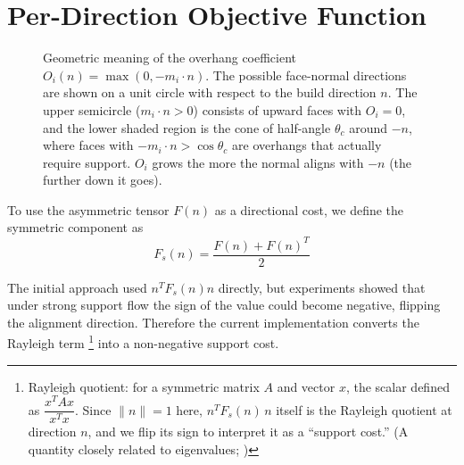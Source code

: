 \documentclass[11pt,a4paper]{article}
\begin{document}
\section{Per-Direction Objective Function}

\begin{figure}[H]
\centering
{}
\caption{Geometric meaning of the overhang coefficient $O_i(n)=\max(0,-m_i\cdot n)$. The possible face-normal directions
are shown on a unit circle with respect to the build direction $n$. The upper semicircle ($m_i\cdot n>0$) consists of upward faces with $O_i=0$,
and the lower shaded region is the cone of half-angle $\theta_c$ around $-n$, where faces with $-m_i\cdot n>\cos\theta_c$ are overhangs that actually
require support. $O_i$ grows the more the normal aligns with $-n$ (the further down it goes).}
\label{fig:overhang-coeff}
\end{figure}

To use the asymmetric tensor $F(n)$ as a directional cost, we define the symmetric component as
\begin{equation}
F_s(n)=\frac{F(n)+F(n)^T}{2}
\end{equation}

The initial approach used $n^TF_s(n)n$ directly, but experiments showed that under strong support flow the sign of the value could become negative,
flipping the alignment direction.
Therefore the current implementation converts the Rayleigh term%
\footnote{Rayleigh quotient: for a symmetric matrix $A$ and vector $x$, the scalar defined as $\dfrac{x^TAx}{x^Tx}$.
Since $\|n\|=1$ here, $n^TF_s(n)\,n$ itself is the Rayleigh quotient at direction $n$,
and we flip its sign to interpret it as a ``support cost.'' (A quantity closely related to eigenvalues; \cite{hornjohnson})}
into a non-negative support cost.
\end{document}

